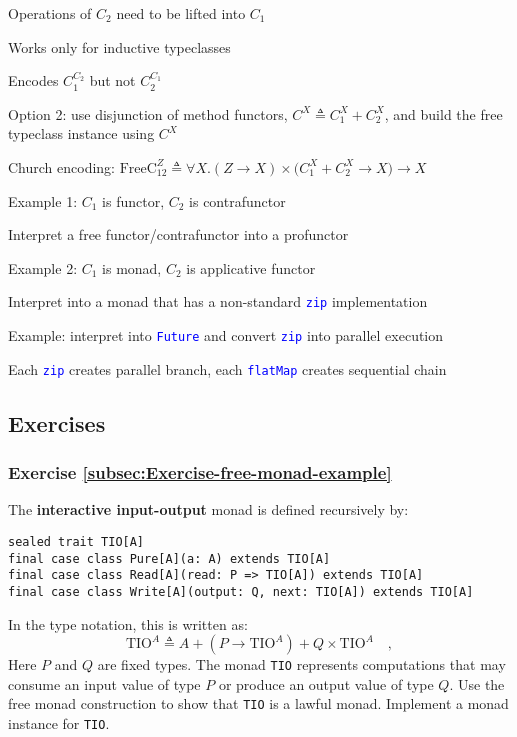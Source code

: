 Operations of $C_{2}$ need to be lifted into $C_{1}$

Works only for inductive typeclasses

Encodes $C_{1}^{C_{2}}$ but not $C_{2}^{C_{1}}$

Option 2: use disjunction of method functors, $C^{X}\triangleq C_{1}^{X}+C_{2}^{X}$,
and build the free typeclass instance using $C^{X}$

Church encoding: $\text{FreeC}_{12}^{Z}\triangleq\forall X.\left(Z\rightarrow X\right)\times\big(C_{1}^{X}+C_{2}^{X}\rightarrow X\big)\rightarrow X$

Example 1: $C_{1}$ is functor, $C_{2}$ is contrafunctor

Interpret a free functor/contrafunctor into a profunctor

Example 2: $C_{1}$ is monad, $C_{2}$ is applicative functor

Interpret into a monad that has a non-standard \texttt{\textcolor{blue}{\footnotesize{}zip}}
implementation

Example: interpret into \texttt{\textcolor{blue}{\footnotesize{}Future}}
and convert \texttt{\textcolor{blue}{\footnotesize{}zip}} into parallel
execution

Each \texttt{\textcolor{blue}{\footnotesize{}zip}} creates parallel
branch, each \texttt{\textcolor{blue}{\footnotesize{}flatMap}} creates
sequential chain


\subsection{Exercises}

\subsubsection{Exercise \label{subsec:Exercise-free-monad-example}\ref{subsec:Exercise-free-monad-example}}

The \textbf{interactive input-output}
monad is defined recursively by:
\begin{lstlisting}
sealed trait TIO[A]
final case class Pure[A](a: A) extends TIO[A]
final case class Read[A](read: P => TIO[A]) extends TIO[A]
final case class Write[A](output: Q, next: TIO[A]) extends TIO[A]
\end{lstlisting}
In the type notation, this is written as:
\[
\text{TIO}^{A}\triangleq A+(P\rightarrow\text{TIO}^{A})+Q\times\text{TIO}^{A}\quad,
\]
Here $P$ and $Q$ are fixed types. The monad \lstinline!TIO!
represents computations that may consume an input value of type $P$
or produce an output value of type $Q$. Use the free monad construction
to show that \lstinline!TIO!
is a lawful monad. Implement a monad instance for \lstinline!TIO!.

